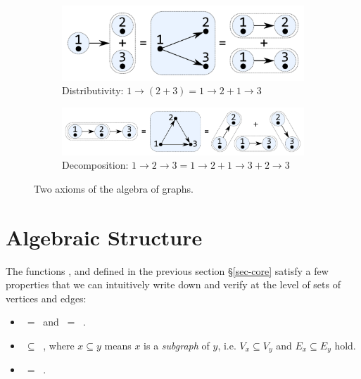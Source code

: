 \begin{figure}
\begin{subfigure}[b]{0.4\linewidth}
\centerline{\includegraphics[scale=0.27]{fig/ax-distributivity.pdf}}
\caption{Distributivity: $1 \rightarrow (2 + 3) = 1 \rightarrow 2 + 1 \rightarrow 3$ }
\end{subfigure}
\hspace{12mm}
\begin{subfigure}[b]{0.5\linewidth}
\centerline{\includegraphics[scale=0.27]{fig/ax-decomposition.pdf}}
\caption{Decomposition: $1 \rightarrow 2 \rightarrow 3 = 1 \rightarrow 2 +
1 \rightarrow 3 + 2 \rightarrow 3$}
\end{subfigure}
\vspace{-1mm}
\caption{Two axioms of the algebra of graphs.\label{fig-axioms}}
\end{figure}

\section{Algebraic Structure}\label{sec-algebra}

The functions ,  and  defined in the previous
section \S\ref{sec-core} satisfy a few properties that we can intuitively write down
and verify at the level of sets of vertices and edges:
\begin{itemize}
    \item {} $\ =\ $  and
     $\ =\ $ .
    \item {} $\ \subseteq\ $ , where $x \subseteq y$ means
    $x$ is a \emph{subgraph} of $y$, i.e. $V_x\subseteq V_y$ and $E_x\subseteq E_y$ hold.
    \item {} $\ =\ $ .
\end{itemize}

